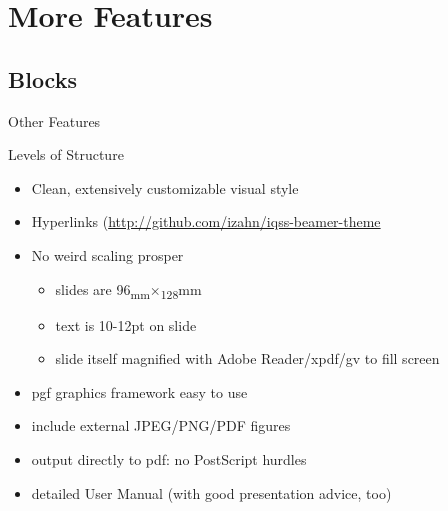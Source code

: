 \documentclass[12pt,ignorenonframetext,compress]{beamer}
\providecommand{\tightlist}{%
  \setlength{\itemsep}{0pt}\setlength{\parskip}{0pt}}
\begin{document}
\hypertarget{more-features}{%
\section{More Features}\label{more-features}}

\hypertarget{blocks}{%
\subsection{Blocks}\label{blocks}}

\begin{frame}{Other Features}
\protect\hypertarget{other-features}{}

\begin{block}{Levels of Structure}

\begin{itemize}
\tightlist
\item
  Clean, extensively customizable visual style
\item
  Hyperlinks
  (\href{click\%20here_}{http://github.com/izahn/iqss-beamer-theme}
\item
  No weird scaling prosper

  \begin{itemize}
  \tightlist
  \item
    slides are 96\textsubscript{mm}\(\times\)\textsubscript{128}mm
  \item
    text is 10-12pt on slide
  \item
    slide itself magnified with Adobe Reader/xpdf/gv to fill screen
  \end{itemize}
\item
  pgf graphics framework easy to use
\item
  include external JPEG/PNG/PDF figures
\item
  output directly to pdf: no PostScript hurdles
\item
  detailed User Manual (with good presentation advice, too)
\end{itemize}

\end{block}

\end{frame}
\end{document}

